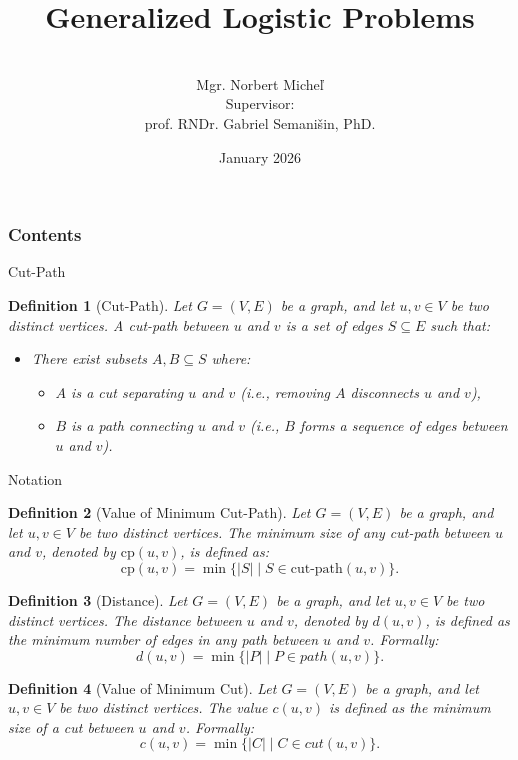 \documentclass [xcolor=svgnames, t] {beamer}
\title[Generalized Logistic Problems]{Generalized Logistic Problems}
\institute[]{Pavol Jozef Šafárik University in Košice \\ Institute of Computer Science}
\author[Mgr. N. Micheľ]{
	\\ Mgr. Norbert Micheľ \\
    Supervisor:
    \\
    prof. RNDr. Gabriel Semanišin, PhD.
    }
\date{January 2026}
\newtheorem{defn}{Definition}[section]
\begin{document}
\begin{frame}
\maketitle
\end{frame}



\begin{frame}
\frametitle{Contents}
\tableofcontents
\end{frame}

\begin{frame}{Cut-Path}


\begin{defn}[Cut-Path]
Let \(G = (V, E)\) be a graph, and let \(u, v \in V\) be two distinct vertices. A cut-path between \(u\) and \(v\) is a set of edges \(S \subseteq E\) such that:
\begin{itemize}
    \item There exist subsets \(A, B \subseteq S\) where:
    \begin{itemize}
        \item \(A\) is a cut separating \(u\) and \(v\) (i.e., removing \(A\) disconnects \(u\) and \(v\)),
        \item \(B\) is a path connecting \(u\) and \(v\) (i.e., \(B\) forms a sequence of edges between \(u\) and \(v\)).
    \end{itemize}
\end{itemize}
\end{defn}
\end{frame}



\begin{frame}{Notation}
\scriptsize
\begin{defn}[Value of Minimum Cut-Path]
Let \(G = (V, E)\) be a graph, and let \(u, v \in V\) be two distinct vertices. The minimum size of any cut-path between \(u\) and \(v\), denoted by \(\text{cp}(u, v)\), is defined as:
\[
\text{cp}(u, v) = \min\{ |S| \mid S \in \text{cut-path}(u, v) \}.
\]
\end{defn}

\begin{defn}[Distance]
Let \(G = (V, E)\) be a graph, and let \(u, v \in V\) be two distinct vertices. The distance between \(u\) and \(v\), denoted by \(d(u, v)\), is defined as the minimum number of edges in any path between \(u\) and \(v\). Formally:
\[
d(u, v) = \min\{ |P| \mid P \in path(u, v) \}.
\]
\end{defn}

\begin{defn}[Value of Minimum Cut]
Let \(G = (V, E)\) be a graph, and let \(u, v \in V\) be two distinct vertices. The value \(c(u, v)\) is defined as the minimum size of a cut between \(u\) and \(v\). Formally:
\[
c(u, v) = \min\{ |C| \mid C \in cut(u, v) \}.
\]
\end{defn}

\end{frame}
\end{document}
